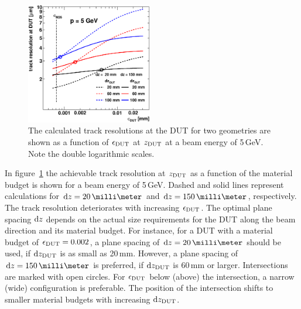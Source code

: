 \begin{figure}[b!]
  \centering
  \includegraphics[width=0.49\textwidth]{figures/trackres_vs_epsdut_DESY} %
   \caption[Track resolution as a function of the beam energy]{
   The calculated track resolutions at the DUT for two geometries are shown as a function of $\mathnormal{\epsilon_{\textrm{DUT}}}$ at $z_{\textrm{DUT}}$ at a beam energy of 5\,GeV. 
   Note the double logarithmic scales. 
   }
 \label{fig:CalcResoP_DUT}
\end{figure}

In figure~\ref{fig:CalcResoP_DUT} the achievable track resolution at $z_{\textrm{DUT}}$ as a function of the material budget is shown for a beam energy of 5\,GeV.
Dashed and solid lines represent calculations for $\dz = 20\,\milli\meter$ and $\dz = 150\,\milli\meter$, respectively. 
The track resolution deteriorates with increasing $\mathnormal{\epsilon_{\textrm{DUT}}}$. 
The optimal plane spacing $\textrm{d}z$ depends on the actual size requirements for the DUT along the beam direction and its material budget.
For instance, for a DUT with a material budget of $\mathnormal{\epsilon_{\textrm{DUT}}} = 0.002$, a plane spacing of $\dz = 20\,\milli\meter$ should be used, if $\textrm{d}z_{\textrm{DUT}}$ is as small as 20\,mm. 
However, a plane spacing of $\dz = 150\,\milli\meter$ is preferred, if $\textrm{d}z_{\textrm{DUT}}$ is 60\,mm or larger. 
Intersections are marked with open circles. 
For $\mathnormal{\epsilon_{\textrm{DUT}}}$ below (above) the intersection, a narrow (wide) configuration is preferable. 
The position of the intersection shifts to smaller material budgets with increasing $\textrm{d}z_{\textrm{DUT}}$. 

